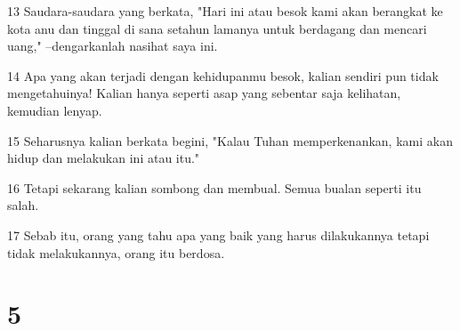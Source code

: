 \par 13 Saudara-saudara yang berkata, "Hari ini atau besok kami akan berangkat ke kota anu dan tinggal di sana setahun lamanya untuk berdagang dan mencari uang," --dengarkanlah nasihat saya ini.
\par 14 Apa yang akan terjadi dengan kehidupanmu besok, kalian sendiri pun tidak mengetahuinya! Kalian hanya seperti asap yang sebentar saja kelihatan, kemudian lenyap.
\par 15 Seharusnya kalian berkata begini, "Kalau Tuhan memperkenankan, kami akan hidup dan melakukan ini atau itu."
\par 16 Tetapi sekarang kalian sombong dan membual. Semua bualan seperti itu salah.
\par 17 Sebab itu, orang yang tahu apa yang baik yang harus dilakukannya tetapi tidak melakukannya, orang itu berdosa.

\chapter{5}

